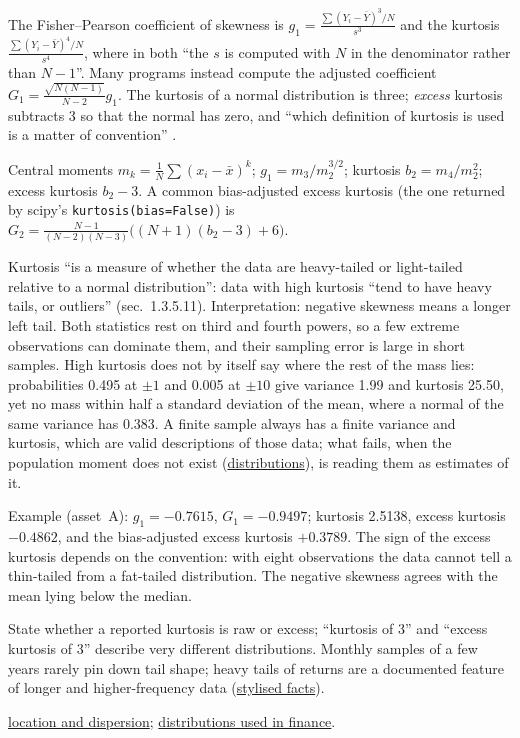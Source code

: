 \begin{qfdefinition}\label{def:return-shape-statistics}
 The Fisher--Pearson coefficient of skewness is $g_1=\frac{\sum(Y_i-\bar Y)^3/N}{s^3}$ and the kurtosis $\frac{\sum(Y_i-\bar Y)^4/N}{s^4}$, where in both ``the $s$ is computed with $N$ in the denominator rather than $N-1$''. Many programs instead compute the adjusted coefficient $G_1=\frac{\sqrt{N(N-1)}}{N-2}g_1$. The kurtosis of a normal distribution is three; \emph{excess} kurtosis subtracts 3 so that the normal has zero, and ``which definition of kurtosis is used is a matter of convention'' \citep[sec.~1.3.5.11]{statistical-methods-handbook}.

 Central moments $m_k=\frac1N\sum(x_i-\bar x)^k$; $g_1=m_3/m_2^{3/2}$; kurtosis $b_2=m_4/m_2^2$; excess kurtosis $b_2-3$. A common bias-adjusted excess kurtosis (the one returned by scipy's \texttt{kurtosis(bias=False)}) is $G_2=\frac{N-1}{(N-2)(N-3)}\bigl((N+1)(b_2-3)+6\bigr)$.

 Kurtosis ``is a measure of whether the data are heavy-tailed or light-tailed relative to a normal distribution'': data with high kurtosis ``tend to have heavy tails, or outliers'' (sec.~1.3.5.11). Interpretation: negative skewness means a longer left tail. Both statistics rest on third and fourth powers, so a few extreme observations can dominate them, and their sampling error is large in short samples. High kurtosis does not by itself say where the rest of the mass lies: probabilities 0.495 at $\pm1$ and 0.005 at $\pm10$ give variance 1.99 and kurtosis 25.50, yet no mass within half a standard deviation of the mean, where a normal of the same variance has 0.383. A finite sample always has a finite variance and kurtosis, which are valid descriptions of those data; what fails, when the population moment does not exist (\hyperref[def:financial-distributions]{distributions}), is reading them as estimates of it.

 Example (asset~A): $g_1=-0.7615$, $G_1=-0.9497$; kurtosis 2.5138, excess kurtosis $-0.4862$, and the bias-adjusted excess kurtosis $+0.3789$. The sign of the excess kurtosis depends on the convention: with eight observations the data cannot tell a thin-tailed from a fat-tailed distribution. The negative skewness agrees with the mean lying below the median.

 State whether a reported kurtosis is raw or excess; ``kurtosis of 3'' and ``excess kurtosis of 3'' describe very different distributions. Monthly samples of a few years rarely pin down tail shape; heavy tails of returns are a documented feature of longer and higher-frequency data (\hyperref[ev:high-frequency-stylised-facts]{stylised facts}).

 \hyperref[def:return-sample-statistics]{location and dispersion}; \hyperref[def:financial-distributions]{distributions used in finance}.

\end{qfdefinition}

